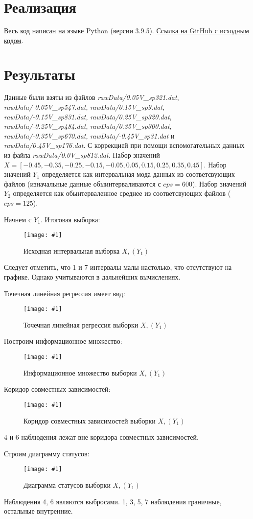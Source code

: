 \documentclass[a4paper,12pt]{article}
\newcommand{\plot}[3]{
    \begin{figure}[H]
        \begin{center}
            \texttt{[image: \#1]}
            \caption{#2}
            \label{#3}
        \end{center}
    \end{figure}
}
\begin{document}
    \section{Реализация}
    \quad Весь код написан на языке Python (версии 3.9.5).
    \href{https://github.com/BoIlAl/Intervals/tree/master/lab3}{Ссылка на GitHub с исходным кодом}.

    \section{Результаты}
    \quad Данные были взяты из файлов \textsl{rawData/0.05V\_sp321.dat}, \textsl{rawData/-0.05V\_sp547.dat}, \textsl{rawData/0.15V\_sp9.dat}, \textsl{rawData/-0.15V\_sp831.dat}, \textsl{rawData/0.25V\_sp320.dat}, \textsl{rawData/-0.25V\_sp484.dat}, \textsl{rawData/0.35V\_sp300.dat}, \textsl{rawData/-0.35V\_sp670.dat}, \textsl{rawData/-0.45V\_sp31.dat} и \textsl{rawData/0.45V\_sp176.dat}. С коррекцией при помощи вспомогательных данных из файла \textsl{rawData/0.0V\_sp812.dat}. Набор значений
    $ X = [-0.45, -0.35, -0.25, -0.15, -0.05, 0.05, 0.15, 0.25, 0.35, 0.45] $. Набор значений $ Y_1 $ определяется как интервальная
    мода данных из соответсвующих файлов (изначальные данные обыинтерваливаются с $eps = 600 $). Набор значений $ Y_2 $ определяется как обынтерваленное среднее из соответсвующих файлов ($eps = 125 $). 
    
    Начнем с $ Y_1 $. Итоговая выборка:
    \plot{img/X, (Y1).png}{Исходная интервальная выборка $ X, (Y_1) $}{p:y1}

    Следует отметить, что 1 и 7 интервалы малы настолько, что отсутствуют на графике. Однако учитываются в дальнейших вычислениях. 
    
    Точечная линейная регрессия имеет вид: 
    \plot{img/Regression X, (Y1).png}{Точечная линейная регрессия выборки $ X, (Y_1) $}{p:regY1}

    Построим информационное множество:
    \plot{img/Inform X, (Y1).png}{Информационное множество выборки $ X, (Y_1) $}{p:infY1}

    Коридор совместных зависимостей:
    \plot{img/Corridor X, (Y1).png}{Коридор совместных зависимостей выборки $ X, (Y_1) $}{p:corY1}

    4 и 6 наблюдения лежат вне коридора совместных зависимостей.

    Строим диаграмму статусов:
    \plot{img/Status diagram X, (Y1).png}{Диаграмма статусов выборки $ X, (Y_1) $}{p:dsY1}

    Наблюдения 4, 6 являются выбросами. 1, 3, 5, 7 наблюдения граничные, остальные внутренние.
\end{document}
